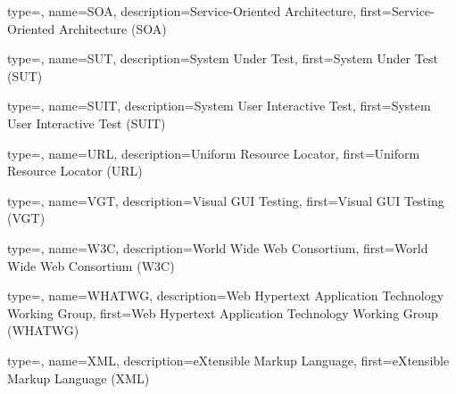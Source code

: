 {
	type=\acronymtype,
	name={SOA},
	description={Service-Oriented Architecture},
	first={Service-Oriented Architecture (SOA)}
}

{
	type=\acronymtype,
	name={SUT},
	description={System Under Test},
	first={System Under Test (SUT)}
}

{
	type=\acronymtype,
	name={SUIT},
	description={System User Interactive Test},
	first={System User Interactive Test (SUIT)}
}

{
	type=\acronymtype,
	name={URL},
	description={Uniform Resource Locator},
	first={Uniform Resource Locator (URL)}
}

{
	type=\acronymtype,
	name={VGT},
	description={Visual GUI Testing},
	first={Visual GUI Testing (VGT)}
}



{
	type=\acronymtype,
	name={W3C},
	description={World Wide Web Consortium},
	first={World Wide Web Consortium (W3C)}
}

{
	type=\acronymtype,
	name={WHATWG},
	description={Web Hypertext Application Technology Working Group},
	first={Web Hypertext Application Technology Working Group (WHATWG)}
}



{
	type=\acronymtype,
	name={XML},
	description={eXtensible Markup Language},
	first={eXtensible Markup Language (XML)}
}